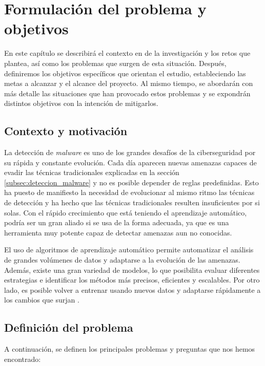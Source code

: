 \chapter{Formulación del problema y objetivos}
\label{ch:problema_y_objetivos}

En este capítulo se describirá el contexto en de la investigación y los retos que plantea, así como los problemas que surgen de esta situación. Después, definiremos los objetivos específicos que orientan el estudio, estableciendo las metas a alcanzar y el alcance del proyecto. Al mismo tiempo, se abordarán con más detalle las situaciones que han provocado estos problemas y se expondrán distintos objetivos con la intención de mitigarlos.

\section{Contexto y motivación}
\label{sec:contexto}

La detección de \textit{malware} es uno de los grandes desafíos de la ciberseguridad por su rápida y constante evolución. Cada día aparecen nuevas amenazas capaces de evadir las técnicas tradicionales explicadas en la sección \ref{subsec:deteccion_malware} y no es posible depender de reglas predefinidas. Esto ha puesto de manifiesto la necesidad de evolucionar al mismo ritmo las técnicas de detección y ha hecho que las técnicas tradicionales resulten insuficientes por si solas. Con el rápido crecimiento que está teniendo el aprendizaje automático, podría ser un gran aliado si se usa de la forma adecuada, ya que es una herramienta muy potente capaz de detectar amenazas aun no conocidas.

\vspace{1em}

El uso de algoritmos de aprendizaje automático permite automatizar el análisis de grandes volúmenes de datos y adaptarse a la evolución de las amenazas. Además, existe una gran variedad de modelos, lo que posibilita evaluar diferentes estrategias e identificar los métodos más precisos, eficientes y escalables. Por otro lado, es posible volver a entrenar usando nuevos datos y adaptarse rápidamente a los cambios que surjan \cite{campus}.

\section{Definición del problema}
\label{sec:definicion}

A continuación, se definen los principales problemas y preguntas que nos hemos encontrado:

